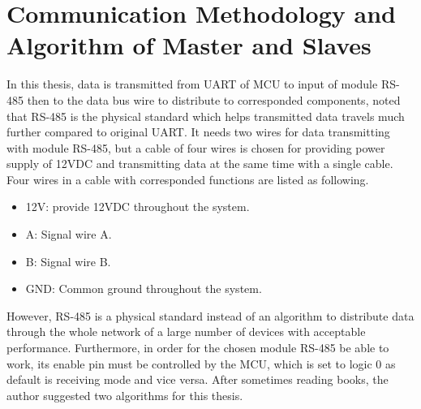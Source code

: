     \section{Communication Methodology and Algorithm of Master and Slaves}
    In this thesis, data is transmitted from UART of MCU to input of module RS-485 then to the data bus wire to distribute to corresponded components, noted that RS-485 is the physical standard which helps transmitted data travels much further compared to original UART. It needs two wires for data transmitting with module RS-485, but a cable of four wires is chosen for providing power supply of 12VDC and transmitting data at the same time with a single cable. Four wires in a cable with corresponded functions are listed as following.
    \begin{itemize}
    \item 12V: provide 12VDC throughout the system.
    \item A: Signal wire A.
    \item B: Signal wire B.
    \item GND: Common ground throughout the system.
    \end{itemize}

    However, RS-485 is a physical standard instead of an algorithm to distribute data through the whole network of a large number of devices with acceptable performance. Furthermore, in order for the chosen module RS-485 be able to work, its enable pin must be controlled by the MCU, which is set to logic 0 as default is receiving mode and vice versa. After sometimes reading books, the author suggested two algorithms for this thesis.
